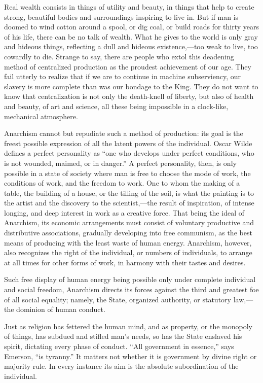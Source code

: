 Real wealth consists in things of utility and beauty, in things that
help to create strong, beautiful bodies and surroundings inspiring to
live in. But if man is doomed to wind cotton around a spool, or dig
coal, or build roads for thirty years of his life, there can be no
talk of wealth. What he gives to the world is only gray and hideous
things, reflecting a dull and hideous existence,---too weak to live,
too cowardly to die. Strange to say, there are people who extol this
deadening method of centralized production as the proudest achievement
of our age. They fail utterly to realize that if we are to continue in
machine subserviency, our slavery is more complete than was our
bondage to the King. They do not want to know that centralization is
not only the death-knell of liberty, but also of health and beauty, of
art and science, all these being impossible in a clock-like,
mechanical atmosphere.

Anarchism cannot but repudiate such a method of production: its goal
is the freest possible expression of all the latent powers of the
individual. Oscar Wilde defines a perfect personality as ``one who
develops under perfect conditions, who is not wounded, maimed, or in
danger.'' A perfect personality, then, is only possible in a state of
society where man is free to choose the mode of work, the conditions
of work, and the freedom to work. One to whom the making of a table,
the building of a house, or the tilling of the soil, is what the
painting is to the artist and the discovery to the scientist,---the
 result of inspiration, of intense longing, and deep interest
in work as a creative force. That being the ideal of Anarchism, its
economic arrangements must consist of voluntary productive and
distributive associations, gradually developing into free communism,
as the best means of producing with the least waste of human energy.
Anarchism, however, also recognizes the right of the individual, or
numbers of individuals, to arrange at all times for other forms of
work, in harmony with their tastes and desires.

Such free display of human energy being possible only under complete
individual and social freedom, Anarchism directs its forces against
the third and greatest foe of all social equality; namely, the State,
organized authority, or statutory law,---the dominion of human
conduct.

Just as religion has fettered the human mind, and as property, or the
monopoly of things, has subdued and stifled man's needs, so has the
State enslaved his spirit, dictating every phase of conduct. ``All
government in essence,'' says Emerson, ``is tyranny.'' It matters not
whether it is government by divine right or majority rule. In every
instance its aim is the absolute subordination of the individual.

